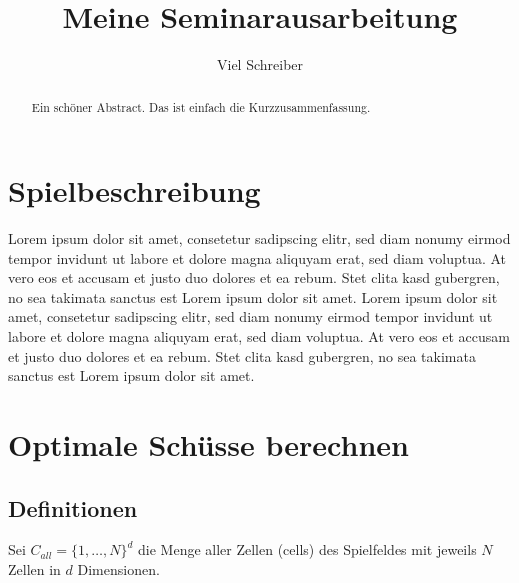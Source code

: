 \documentclass[a4paper,12pt]{llncs}
\numberwithin{equation}{section}
\begin{document}


\author{Viel Schreiber}

\title{Meine Seminarausarbeitung}

\maketitle

\thispagestyle{empty}

\begin{abstract}
Ein schöner Abstract. Das ist einfach die Kurzzusammenfassung.
\end{abstract}

\section{Spielbeschreibung}
Lorem ipsum dolor sit amet, consetetur sadipscing elitr, sed diam nonumy eirmod tempor invidunt ut labore et dolore magna aliquyam erat, sed diam voluptua. At vero eos et accusam et justo duo dolores et ea rebum. Stet clita kasd gubergren, no sea takimata sanctus est Lorem ipsum dolor sit amet. Lorem ipsum dolor sit amet, consetetur sadipscing elitr, sed diam nonumy eirmod tempor invidunt ut labore et dolore magna aliquyam erat, sed diam voluptua. At vero eos et accusam et justo duo dolores et ea rebum. Stet clita kasd gubergren, no sea takimata sanctus est Lorem ipsum dolor sit amet.

\section{Optimale Schüsse berechnen}

\subsection{Definitionen}
\begin{definition}
Sei $C_{all}=\{1, \dots, N\}^d$ die Menge aller Zellen (cells) des Spielfeldes mit jeweils $N$ Zellen in $d$ Dimensionen.
\end{definition}
\end{document}
